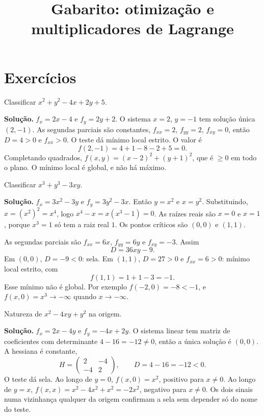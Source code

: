 \documentclass[11pt,a4paper]{article}
\title{Gabarito: otimização e multiplicadores de Lagrange}
\author{}
\date{}
\begin{document}
\maketitle
\tableofcontents

\section{Exercícios}

\begin{exercicio}
Classificar $x^2+y^2-4x+2y+5$.

\textbf{Solução.}
$f_x=2x-4$ e $f_y=2y+2$. O sistema $x=2$, $y=-1$ tem solução única $(2,-1)$. As segundas parciais são constantes, $f_{xx}=2$, $f_{yy}=2$, $f_{xy}=0$, então $D=4>0$ e $f_{xx}>0$. O teste dá mínimo local estrito. O valor é
\[
f(2,-1)=4+1-8-2+5=0.
\]
Completando quadrados, $f(x,y)=(x-2)^2+(y+1)^2$, que é $\ge 0$ em todo o plano. O mínimo local é global, e não há máximo.
\end{exercicio}

\begin{exercicio}
Classificar $x^3+y^3-3xy$.

\textbf{Solução.}
$f_x=3x^2-3y$ e $f_y=3y^2-3x$. Então $y=x^2$ e $x=y^2$. Substituindo, $x=(x^2)^2=x^4$, logo $x^4-x=x(x^3-1)=0$. As raízes reais são $x=0$ e $x=1$, porque $x^3=1$ só tem a raiz real $1$. Os pontos críticos são $(0,0)$ e $(1,1)$.

As segundas parciais são $f_{xx}=6x$, $f_{yy}=6y$ e $f_{xy}=-3$. Assim
\[
D=36xy-9.
\]
Em $(0,0)$, $D=-9<0$: sela. Em $(1,1)$, $D=27>0$ e $f_{xx}=6>0$: mínimo local estrito, com
\[
f(1,1)=1+1-3=-1.
\]
Esse mínimo não é global. Por exemplo $f(-2,0)=-8<-1$, e $f(x,0)=x^3\to-\infty$ quando $x\to-\infty$.
\end{exercicio}

\begin{exercicio}
Natureza de $x^2-4xy+y^2$ na origem.

\textbf{Solução.}
$f_x=2x-4y$ e $f_y=-4x+2y$. O sistema linear tem matriz de coeficientes com determinante $4-16=-12\neq 0$, então a única solução é $(0,0)$. A hessiana é constante,
\[
H=\begin{pmatrix}2&-4\\-4&2\end{pmatrix},\qquad D=4-16=-12<0.
\]
O teste dá sela. Ao longo de $y=0$, $f(x,0)=x^2$, positivo para $x\neq 0$. Ao longo de $y=x$, $f(x,x)=x^2-4x^2+x^2=-2x^2$, negativo para $x\neq 0$. Os dois sinais numa vizinhança qualquer da origem confirmam a sela sem depender só do nome do teste.
\end{exercicio}
\end{document}
